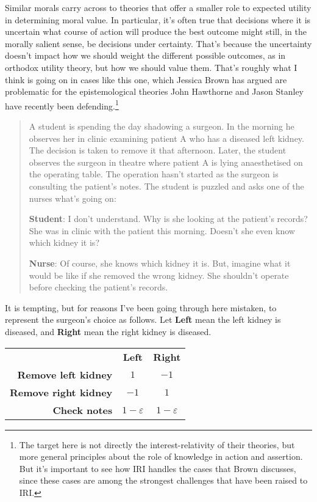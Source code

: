 \documentclass[11pt,oneside]{book}
\begin{document}
Similar morals carry across to theories that offer a smaller role to expected utility in determining moral value. In particular, it's often true that decisions where it is uncertain what course of action will produce the best outcome might still, in the morally salient sense, be decisions under certainty. That's because the uncertainty doesn't impact how we should weight the different possible outcomes, as in orthodox utility theory, but how we should value them. That's roughly what I think is going on in cases like this one, which Jessica Brown has argued are problematic for the epistemological theories John Hawthorne and Jason Stanley have recently been defending.\footnote{The target here is not directly the interest-relativity of their theories, but more general principles about the role of knowledge in action and assertion. But it's important to see how IRI handles the cases that Brown discusses, since these cases are among the strongest challenges that have been raised to IRI.}

\begin{quote}
A student is spending the day shadowing a surgeon. In the morning he observes her in clinic examining patient A who has a diseased left kidney. The decision is taken to remove it that afternoon. Later, the student observes the surgeon in theatre where patient A is lying anaesthetised on the operating table. The operation hasn't started as the surgeon is consulting the patient's notes. The student is puzzled and asks one of the nurses what's going on: 

\textbf{Student}: I don't understand. Why is she looking at the patient's records? She was in clinic with the patient this morning. Doesn't she even know which kidney it is? 

\textbf{Nurse}: Of course, she knows which kidney it is. But, imagine what it would be like if she removed the wrong kidney. She shouldn't operate before checking the patient's records. \citep[1144-1145]{Brown2008-BROKAP}
\end{quote}

\noindent It is tempting, but for reasons I've been going through here mistaken, to represent the surgeon's choice as follows. Let \textbf{Left} mean the left kidney is diseased, and \textbf{Right} mean the right kidney is diseased.

\begin{center}
\begin{tabular}{r c c}
 & \textbf{Left} & \textbf{Right} \\
\textbf{Remove left kidney} & \(1\) & \(-1\) \\
\textbf{Remove right kidney} & \(-1\) & \(1\) \\
\textbf{Check notes} & \(1-\varepsilon\) & \(1-\varepsilon\) \\
\end{tabular}
\end{center}
\end{document}
